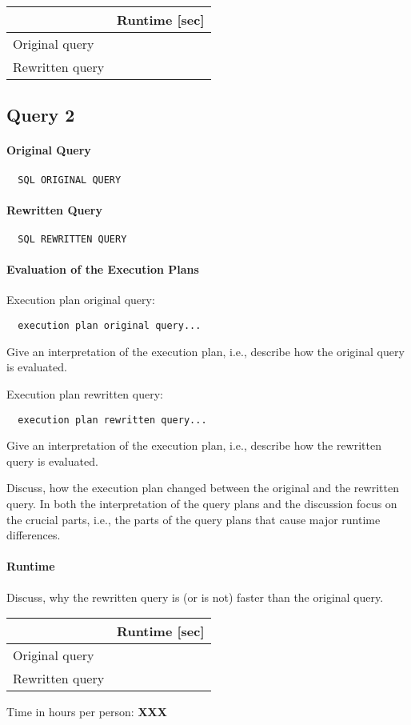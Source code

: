 \documentclass[11pt]{scrartcl}
\begin{document}
\begin{table}[H]
  \begin{tabular}{l|r}
    & Runtime [sec] \\
   \hline
    Original query & \\
    Rewritten query & \\
  \end{tabular}
\end{table}

\subsection*{Query 2}

\paragraph{Original Query}

{\small
\begin{verbatim}
  SQL ORIGINAL QUERY
\end{verbatim}
}

\paragraph{Rewritten Query}

{\small
\begin{verbatim}
  SQL REWRITTEN QUERY
\end{verbatim}
}

\paragraph{Evaluation of the Execution Plans}

Execution plan original query:

\begin{verbatim}
  execution plan original query...
\end{verbatim}

Give an interpretation of the execution plan, i.e., describe how the
original query is evaluated.

Execution plan rewritten query:

\begin{verbatim}
  execution plan rewritten query...
\end{verbatim}

Give an interpretation of the execution plan, i.e., describe how the
rewritten query is evaluated.

Discuss, how the execution plan changed between the original and the
rewritten query. In both the interpretation of the query plans and the
discussion focus on the crucial parts, i.e., the parts of the query
plans that cause major runtime differences.

\paragraph{Runtime} Discuss, why the rewritten query is (or is not)
faster than the original query.


\begin{table}[H]
  \begin{tabular}{l|r}
    & Runtime [sec] \\
   \hline
    Original query & \\
    Rewritten query & \\
  \end{tabular}
\end{table}


  Time in hours per person: {\bf XXX}
\end{document}
